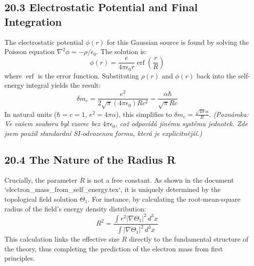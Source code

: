 \documentclass[12pt, a4paper]{article}
\begin{document}
\subsection*{20.3 Electrostatic Potential and Final Integration}
The electrostatic potential \( \phi(r) \) for this Gaussian source is found by solving the Poisson equation \( \nabla^2 \phi = -\rho/\epsilon_0 \). The solution is:
\begin{equation}
    \phi(r) = \frac{e}{4\pi\epsilon_0 r} \operatorname{erf}\left( \frac{r}{R} \right)
\end{equation}
where \( \operatorname{erf} \) is the error function. Substituting \( \rho(r) \) and \( \phi(r) \) back into the self-energy integral yields the result:
\begin{equation}
    \delta m_e = \frac{e^2}{2\sqrt{\pi} (4\pi\epsilon_0) R c^2} = \frac{\alpha \hbar}{\sqrt{\pi} R c}
\end{equation}
In natural units (\(\hbar=c=1\), \( e^2 = 4\pi\alpha \)), this simplifies to \( \delta m_e = \frac{\sqrt{4\pi}\alpha}{R} \).
\textit{(Poznámka: Ve vašem souboru byl vzorec bez \(4\pi\epsilon_0\), což odpovídá jinému systému jednotek. Zde jsem použil standardní SI-odvozenou formu, která je explicitnější.)}

\subsection*{20.4 The Nature of the Radius R}
Crucially, the parameter \(R\) is not a free constant. As shown in the document `electron_mass_from_self_energy.tex`, it is uniquely determined by the topological field solution \(\Theta_1\). For instance, by calculating the root-mean-square radius of the field's energy density distribution:
\begin{equation}
    R^2 = \frac{\int r^2 |\nabla \Theta_1|^2 \, d^3x}{\int |\nabla \Theta_1|^2 \, d^3x}
\end{equation}
This calculation links the effective size \(R\) directly to the fundamental structure of the theory, thus completing the prediction of the electron mass from first principles.
\end{document}
